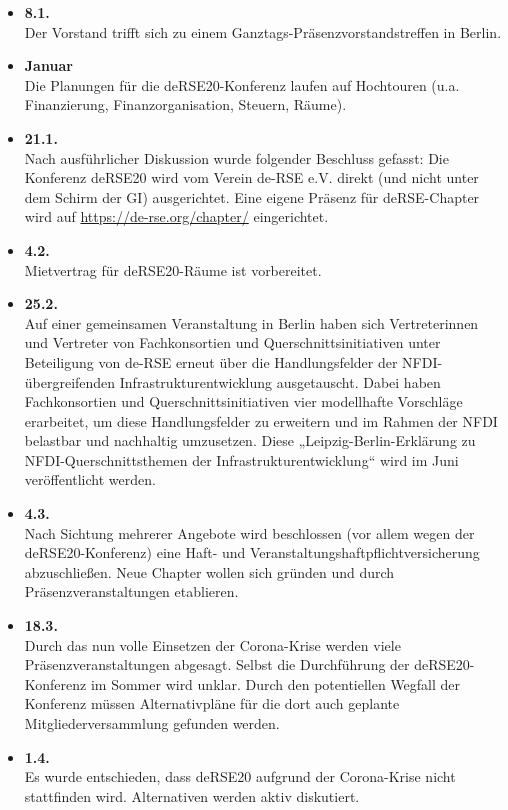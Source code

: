 \begin{itemize}
 \item \textbf{8.1.}\\Der Vorstand trifft sich zu einem Ganztags-Präsenzvorstandstreffen in Berlin.
 \item \textbf{Januar}\\Die Planungen für die deRSE20-Konferenz laufen auf Hochtouren (u.a. Finanzierung, Finanzorganisation, Steuern, Räume).
 \item \textbf{21.1.}\\Nach ausführlicher Diskussion wurde folgender Beschluss gefasst: Die Konferenz deRSE20 wird vom Verein de-RSE e.V. direkt (und nicht unter dem Schirm der GI) ausgerichtet.
 Eine eigene Präsenz für deRSE-Chapter wird auf \href{https://de-rse.org/chapter/}{https://de-rse.org/chapter/} eingerichtet.
 \item \textbf{4.2.}\\Mietvertrag für deRSE20-Räume ist vorbereitet.
 \item \textbf{25.2.}\\Auf einer gemeinsamen Veranstaltung in Berlin haben sich Vertreterinnen und Vertreter von Fachkonsortien und Querschnittsinitiativen unter Beteiligung von de-RSE erneut über die Handlungsfelder der NFDI-übergreifenden Infrastrukturentwicklung ausgetauscht. Dabei haben Fachkonsortien und Querschnittsinitiativen vier modellhafte Vorschläge erarbeitet, um diese Handlungsfelder zu erweitern und im Rahmen der NFDI belastbar und nachhaltig umzusetzen. Diese „Leipzig-Berlin-Erklärung zu NFDI-Querschnittsthemen der Infrastrukturentwicklung“ wird im Juni veröffentlicht werden.
 \item \textbf{4.3.}\\Nach Sichtung mehrerer Angebote wird beschlossen (vor allem wegen der deRSE20-Konferenz) eine Haft- und Veranstaltungshaftpflichtversicherung abzuschließen. Neue Chapter wollen sich gründen und durch Präsenzveranstaltungen etablieren.
 \item \textbf{18.3.}\\Durch das nun volle Einsetzen der Corona-Krise werden viele Präsenzveranstaltungen abgesagt. Selbst die Durchführung der deRSE20-Konferenz im Sommer wird unklar. Durch den potentiellen Wegfall der Konferenz müssen Alternativpläne für die dort auch geplante Mitgliederversammlung gefunden werden.
 \item \textbf{1.4.}\\Es wurde entschieden, dass deRSE20 aufgrund der Corona-Krise nicht stattfinden wird. Alternativen werden aktiv diskutiert.

\end{itemize}
